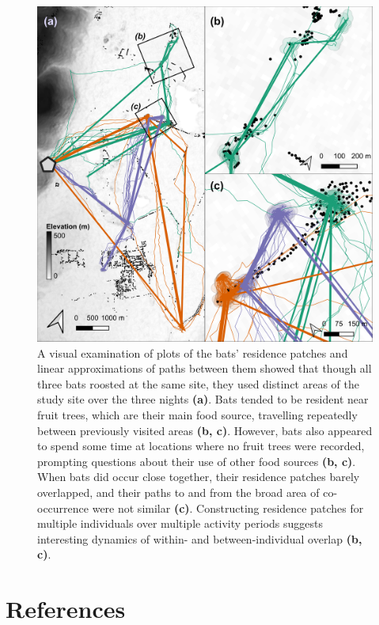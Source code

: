 \documentclass[]{scrreprt}
\begin{document}
\begin{figure}
\centering
\includegraphics{figures/fig_07_bats.png}
\caption{A visual examination of plots of the bats' residence patches and linear approximations of paths between them showed that though all three bats roosted at the same site, they used distinct areas of the study site over the three nights \textbf{(a)}.
Bats tended to be resident near fruit trees, which are their main food source, travelling repeatedly between previously visited areas \textbf{(b, c)}.
However, bats also appeared to spend some time at locations where no fruit trees were recorded, prompting questions about their use of other food sources \textbf{(b, c)}.
When bats did occur close together, their residence patches barely overlapped, and their paths to and from the broad area of co-occurrence were not similar \textbf{(c)}.
Constructing residence patches for multiple individuals over multiple activity periods suggests interesting dynamics of within- and between-individual overlap \textbf{(b, c)}.}
\end{figure}

\hypertarget{references}{%
\chapter{References}\label{references}}
\end{document}
